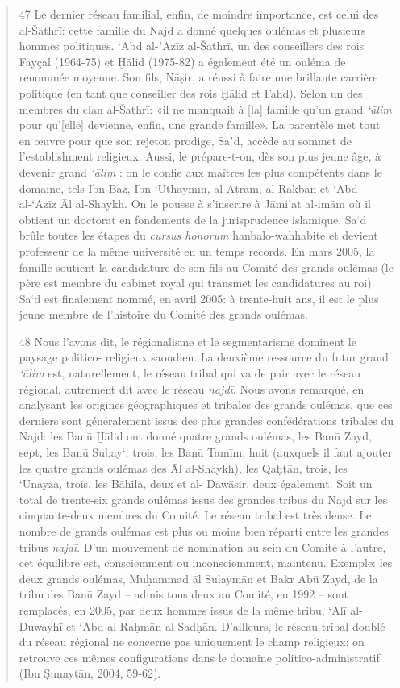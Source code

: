 \begin{quote}
47 Le dernier réseau familial, enfin, de moindre importance, est celui
des al-Šathrī: cette
famille du Najd a donné quelques oulémas et plusieurs hommes politiques.
`Abd al-‛Azīz al-Šathrī, un des conseillers des rois Fayçal (1964-75) et
Ḫālid (1975-82) a également été un ouléma de renommée moyenne. Son fils,
Nāṣir, a réussi à faire une brillante carrière politique (en tant que
conseiller des rois Ḫālid et Fahd). Selon un des
membres du clan al-Šathrī: «il ne manquait à {[}la{]} famille qu'un
grand \emph{`ālim} pour qu'{[}elle{]} devienne, enfin, une grande
famille». La parentèle met tout en œuvre pour que son rejeton prodige,
Sa‛d, accède au sommet de l'establishment religieux. Aussi, le
prépare-t-on, dès son plus jeune âge, à devenir grand \emph{`ālim} : on
le confie aux maîtres les plus compétents dans le domaine, tels Ibn Bāz,
Ibn `Uthaymīn, al-Aṭram, al-Rakbān et `Abd al-`Azīz Āl al-Shaykh. On le
pousse à s'inscrire à Jāmi'at al-imām où il obtient un doctorat en
fondements de la jurisprudence islamique. Sa`d brûle toutes les étapes
du \emph{cursus honorum} hanbalo-wahhabite et devient professeur de la
même université en un temps records. En mars 2005, la famille soutient
la candidature de son fils au Comité des grands oulémas (le père est
membre du cabinet royal qui transmet les candidatures au roi). Sa`d est
finalement nommé, en avril 2005: à trente-huit ans, il est le plus jeune
membre de l'histoire du Comité des grands oulémas.

48 Nous l'avons dit, le régionalisme et le segmentarisme dominent le
paysage politico- religieux saoudien. La deuxième ressource du futur
grand \emph{`ālim} est, naturellement, le réseau tribal qui va de pair
avec le réseau régional, autrement dit avec le réseau \emph{najdī}. Nous
avons remarqué, en analysant les origines géographiques et tribales des
grands oulémas, que ces derniers sont généralement issus des plus
grandes confédérations tribales du Najd: les Banū Ḫālid ont donné quatre
grands oulémas, les Banū Zayd, sept, les Banū Subay`, trois, les Banū
Tamīm, huit (auxquels il faut ajouter les quatre grands oulémas des Āl
al-Shaykh), les Qaḥṭān, trois, les `Unayza, trois, les Bāhila, deux et
al- Dawāsir, deux également. Soit un total de trente-six grands oulémas
issus des grandes tribus du Najd sur les cinquante-deux membres du
Comité. Le réseau tribal est très dense. Le nombre de grands oulémas est
plus ou moins bien réparti entre les grandes tribus \emph{najdī}. D'un
mouvement de nomination au sein du Comité à l'autre, cet équilibre est,
consciemment ou inconsciemment, maintenu. Exemple: les deux grands
oulémas, Muḥammad āl Sulaymān et Bakr Abū Zayd, de la tribu des Banū
Zayd -- admis tous deux au Comité, en 1992 -- sont remplacés, en 2005,
par deux hommes issus de la même tribu, `Alī al-Ḍuwayḥī et `Abd
al-Raḥmān al-Sadḥān. D'ailleurs, le réseau tribal doublé du réseau
régional ne concerne pas uniquement le champ religieux: on retrouve ces
mêmes configurations dans le domaine politico-administratif (Ibn
Ṣunaytān, 2004, 59-62).


\end{quote}
